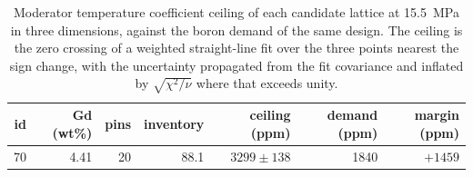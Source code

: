 \begin{table}[htbp]
  \centering
  \caption[Boron ceiling of each candidate lattice]{Moderator temperature coefficient ceiling of each candidate lattice at \SI{15.5}{MPa} in three dimensions, against the boron demand of the same design. The ceiling is the zero crossing of a weighted straight-line fit over the three points nearest the sign change, with the uncertainty propagated from the fit covariance and inflated by $\sqrt{\chi^2/\nu}$ where that exceeds unity.}
  \label{tab:c9-ceilings}
  \begin{tabular}{rrrrrrr}
    \toprule
    id & Gd (wt\%) & pins & inventory & ceiling (ppm) & demand (ppm) & margin (ppm) \\
    \midrule
    70 & 4.41 & 20 & 88.1 & $3299 \pm 138$ & 1840 & $+1459$ \\
    \bottomrule
  \end{tabular}
\end{table}
